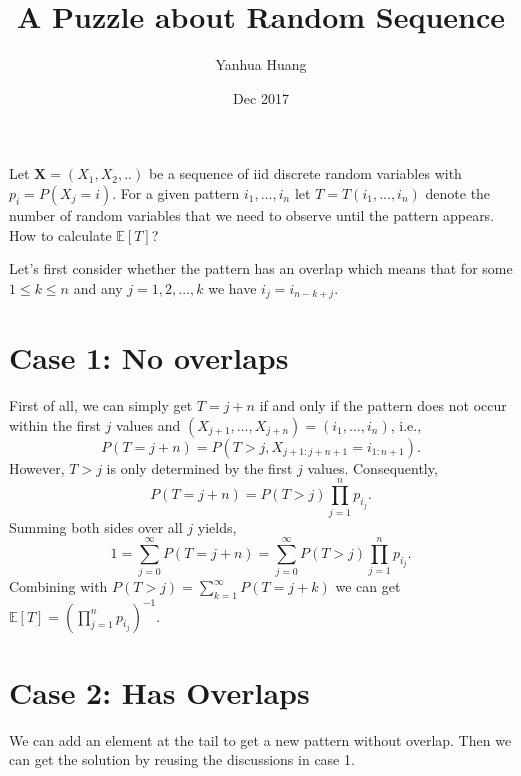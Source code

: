 \documentclass[a4paper,11pt]{article}
\begin{document}
\title{A Puzzle about Random Sequence}
\author{Yanhua Huang}
\date{Dec 2017}
\maketitle

Let $\textbf{X} = (X_1, X_2, ..)$ be a sequence of iid discrete random variables with $p_i = P(X_j = i)$. For a given pattern $i_1, ..., i_n$ let $T = T(i_1, ..., i_n)$ denote the number of random variables that we need to observe until the pattern appears. How to calculate $\mathbb{E}[T]$?

Let's first consider whether the pattern has an overlap which means that for some $1 \le k \le n$ and any $j = 1, 2, ..., k$ we have $i_j = i_{n-k+j}$.

\section*{Case 1: No overlaps}

First of all, we can simply get $T = j + n$ if and only if the pattern does not occur within the first $j$ values and $(X_{j+1}, ..., X_{j+n}) = (i_1, ..., i_n)$, i.e.,
\begin{equation}
P(T = j + n) = P(T > j, X_{j+1:j+n+1}=i_{1:n+1}). 
\end{equation}
However, $T > j$ is only determined by the first $j$ values. Consequently,
\begin{equation}
P(T = j + n) = P(T > j)\prod_{j=1}^np_{i_j}.
\end{equation}
Summing both sides over all $j$ yields, 
\begin{equation}
1 = \sum_{j=0}^{\infty}{P(T = j + n)} = \sum_{j=0}^{\infty}P(T > j)\prod_{j=1}^np_{i_j}.
\end{equation}
Combining with $P(T > j) = \sum_{k=1}^{\infty}P(T = j + k)$ we can get $\mathbb{E}[T] = (\prod_{j=1}^np_{i_j})^{-1}$.

\section*{Case 2: Has Overlaps}
We can add an element at the tail to get a new pattern without overlap. Then we can get the solution by reusing the discussions in case 1.
\end{document}
